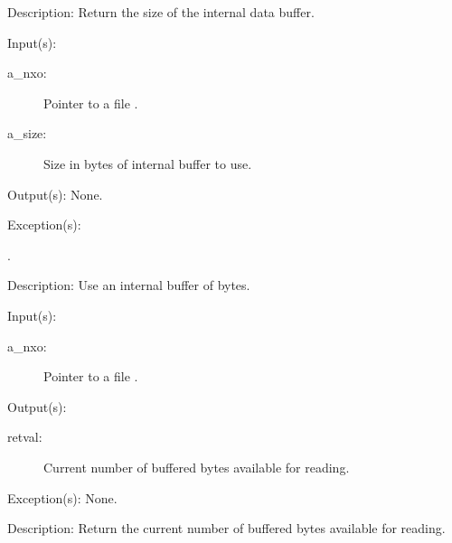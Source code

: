 \begin{capi}
\begin{capilist}
	\item[Description: ]
		Return the size of the internal data buffer.
	\end{capilist}
\label{nxo_file_buffer_size_set}
	\begin{capilist}
	\item[Input(s): ]
		\begin{description}\item[]
		\item[a\_nxo: ]
			Pointer to a file .
		\item[a\_size: ]
			Size in bytes of internal buffer to use.
		\end{description}
	\item[Output(s): ] None.
	\item[Exception(s): ]
		\begin{description}\item[]
		\item[.]
		\end{description}
	\item[Description: ]
		Use an internal buffer of  bytes.
	\end{capilist}
\label{nxo_file_buffer_count}
	\begin{capilist}
	\item[Input(s): ]
		\begin{description}\item[]
		\item[a\_nxo: ]
			Pointer to a file \classname{nxo}.
		\end{description}
	\item[Output(s): ]
		\begin{description}\item[]
		\item[retval: ]
			Current number of buffered bytes available for reading.
		\end{description}
	\item[Exception(s): ] None.
	\item[Description: ]
		Return the current number of buffered bytes available for
		reading.
	\end{capilist}
\label{nxo_file_buffer_flush}
\end{capi}
